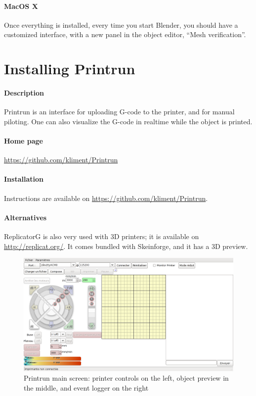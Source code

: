 \documentclass{article}
\begin{document}
	\paragraph{MacOS X} %

	Once everything is installed, every time you start Blender, you should have a customized interface, with a new panel in the object editor, “Mesh verification”.

\newpage

\section{Installing Printrun}

	\paragraph{Description} Printrun is an interface for uploading G-code to the printer, and for manual piloting. One can also visualize the G-code in realtime while the object is printed.

	\paragraph{Home page} \url{https://github.com/kliment/Printrun}

	\paragraph{Installation} Instructions are available on \url{https://github.com/kliment/Printrun}.

	\paragraph{Alternatives} ReplicatorG is also very used with 3D printers; it is available on \url{http://replicat.org/}. It comes bundled with Skeinforge, and it has a 3D preview.

	\begin{figure}[h!]
		\centering
		\includegraphics[width=0.7\linewidth]{printrun.png}
		\caption{Printrun main screen: printer controls on the left, object preview in the middle, and event logger on the right}
	\end{figure}
\end{document}
